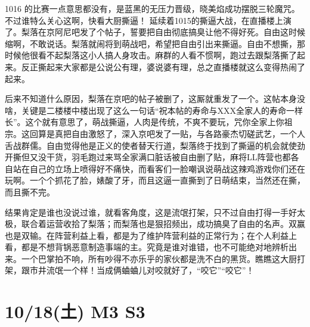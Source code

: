 1016 的比赛一点意思都没有，是蓝黑的无压力晋级，晓美焰成功摆脱三轮魔咒。不过谁特么关心这啊，快看大厨撕逼！
延续着1015的撕逼大战，在直播楼上演了。梨落在京阿尼吧发了个帖子，誓要把自由彻底搞臭让他不得好死。自由这时候缩啊，不敢说话。梨落就闹将到萌战吧，希望把自由引出来撕逼。自由不想撕，那时候他很看不起梨落这小人搞人身攻击。麻群的人看不惯啊，跑过去跟梨落撕了起来。反正撕起来大家都是公说公有理，婆说婆有理，总之直播楼就这么变得热闹了起来。

后来不知道什么原因，梨落在京吧的帖子被删了，这厮就重发了一个。这帖本身没啥，关键是二楼楼中楼出现了这么一句话“祝本帖的寿命与XXX全家人的寿命一样长”。这个就有意思了，萌战撕逼，人肉是传统，不爽不要玩，咒你全家上你祖宗。这回算是真把自由激怒了，深入京吧发了一贴，与各路豪杰切磋武艺，一个人舌战群儒。自由觉得他是正义的使者替天行道，梨落终于找到了撕逼的机会就使劲开撕但又没干货，羽毛跑过来骂全家满口脏话被自由删了贴，麻将LL阵营也都各自站在自己的立场上喷得好不痛快，而看客们一脸嘲讽说萌战这辣鸡游戏你们还在玩啊。一个个抓花了脸，婊酸了牙，而且这逼一直撕到了日萌结束，当然还在撕，而且撕不完。

结果肯定是谁也没说过谁，就看客角度，这是流氓打架，只不过自由打得一手好太极，联合着运营收拾了梨落；而梨落也是狠招频出，成功搞臭了自由的名声。双赢也是双输。在阵营利益上看，都是为了维护阵营利益的正常行为；在个人利益上看，都是不想背锅恶意制造事端的主。究竟是谁对谁错，也不可能绝对地辨析出来。一个巴掌拍不响，所有吵得不亦乐乎的家伙都是洗不白的黑货。瞧瞧这大厨打架，跟市井流氓一个样！当成俩蛐蛐儿对咬就好了，“咬它”“咬它”！

\section{10/18(土) M3 S3}


